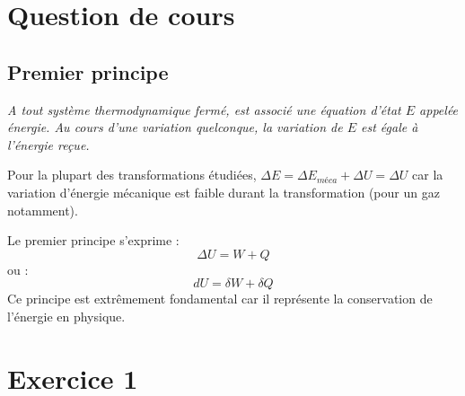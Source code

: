 \documentclass{report}
\begin{document}
\section*{Question de cours}

\subsection*{Premier principe}

\textit{A tout système thermodynamique fermé, est associé une équation d'état $E$ appelée énergie. Au cours d'une variation quelconque, la variation de $E$ est égale à l'énergie reçue.}

Pour la plupart des transformations étudiées, $\Delta E = \Delta E_{méca}+\Delta U =  \Delta U $ car la variation d'énergie mécanique est faible durant la transformation (pour un gaz notamment).

Le premier principe s'exprime :
\begin{equation}
	\Delta U = W+Q
\end{equation}
ou :
\begin{equation}
	d U = \delta W+ \delta Q
\end{equation}
Ce principe est extrêmement fondamental car il représente la conservation de l'énergie en physique.
 
\section*{Exercice 1}
\end{document}
